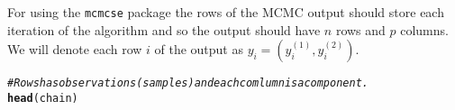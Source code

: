\documentclass[11pt]{article}\usepackage[]{graphicx}\usepackage[]{color}
\makeatletter
\newcommand{\hlcom}[1]{\textcolor[rgb]{0.678,0.584,0.686}{\textit{#1}}}%
\newcommand{\hlstd}[1]{\textcolor[rgb]{0.345,0.345,0.345}{#1}}%
\newcommand{\hlkwd}[1]{\textcolor[rgb]{0.737,0.353,0.396}{\textbf{#1}}}%
\newenvironment{kframe}{%
 \def\at@end@of@kframe{}%
 \ifinner\ifhmode%
  \def\at@end@of@kframe{\end{minipage}}%
  \begin{minipage}{\columnwidth}%
 \fi\fi%
 \def\FrameCommand##1{\hskip\@totalleftmargin \hskip-\fboxsep
 \colorbox{shadecolor}{##1}\hskip-\fboxsep
     \hskip-\linewidth \hskip-\@totalleftmargin \hskip\columnwidth}%
 \MakeFramed {\advance\hsize-\width
   \@totalleftmargin\z@ \linewidth\hsize
   \@setminipage}}%
 {\par\unskip\endMakeFramed%
 \at@end@of@kframe}
\newenvironment{knitrout}{}{} %
\makeatother
\begin{document}
For using the \texttt{mcmcse} package the rows of the MCMC output should store each iteration of the algorithm and so the output should have $n$ rows and $p$ columns. We will denote each row $i$ of the output as $y_i = (y^{(1)}_i, y^{(2)}_i)$.
\begin{knitrout}
\color{fgcolor}\begin{kframe}


{\ttfamily\noindent\bfseries{}}\end{kframe}
\end{knitrout}
\begin{knitrout}
\color{fgcolor}\begin{kframe}
\begin{alltt}
\hlcom{#Rows has observations (samples) and each comlumn is a component. }
\hlkwd{head}\hlstd{(chain)}
\end{alltt}


{\ttfamily\noindent\bfseries\color{errorcolor}{\#\# Error in head(chain): object 'chain' not found}}\end{kframe}
\end{knitrout}
\end{document}
